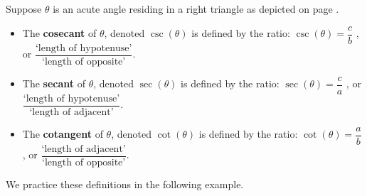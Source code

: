 \begin{tcolorbox}
    
\begin{defn} \label{righttriangletherest}

Suppose $\theta$ is an acute angle residing in a right triangle as depicted on page \pageref{righttranglediagram}.

\begin{itemize}

\item  The  \textbf{cosecant} of $\theta$, denoted $\csc(\theta)$ is defined by the ratio: $\csc(\theta) = \dfrac{c}{b}$ , or $\dfrac{\text{`length of hypotenuse'}}{\text{`length of opposite'}}$.

\item  The  \textbf{secant} of $\theta$, denoted $\sec(\theta)$ is defined by the ratio: $\sec(\theta) = \dfrac{c}{a} $ , or $\dfrac{\text{`length of hypotenuse'}}{\text{`length of adjacent'}}$.

\item  The  \textbf{cotangent} of $\theta$, denoted $\cot(\theta)$ is defined by the ratio: $\cot(\theta) = \dfrac{a}{b} $ , or $\dfrac{\text{`length of adjacent'}}{\text{`length of opposite'}}$.

\end{itemize}

\end{defn}

\end{tcolorbox}

We practice these definitions in the following example.

